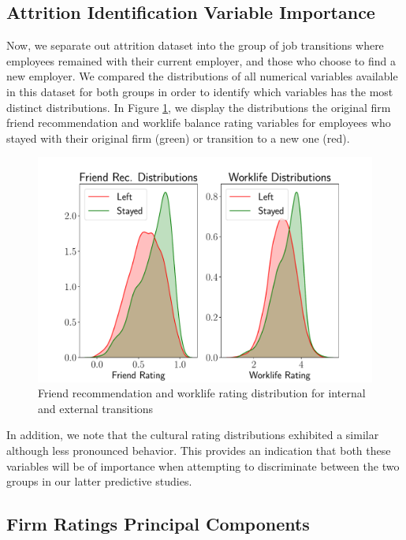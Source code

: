 \documentclass[10pt]{article}
\begin{document}
\subsection{Attrition Identification Variable Importance}

Now, we separate out attrition dataset into the group of job transitions 
where employees remained with their current employer, and those who 
choose to find a new employer. We compared the distributions of all 
numerical variables available in this dataset for both groups 
in order to identify which variables has the most distinct 
distributions.  In Figure \ref{fig:discdist}, we display the 
distributions the original firm friend recommendation and 
worklife balance rating variables for employees who 
stayed with their original firm (green) or transition to a new one (red). 
%
\begin{figure}[thb]
    \centering
	\includegraphics[width=1.0\linewidth]{discdist.pdf}
	\caption{Friend recommendation and worklife rating distribution for internal 
    and external transitions}
	\label{fig:discdist}
\end{figure}
%
In addition, we note that the cultural rating distributions exhibited a similar 
although less pronounced behavior.  This provides an indication that both 
these variables will be of importance when attempting to discriminate between 
the two groups in our latter predictive studies. 

\subsection{Firm Ratings Principal Components}\label{pcasec}
\end{document}
